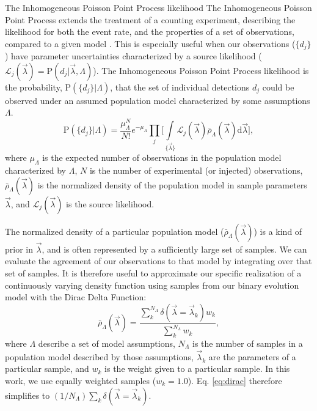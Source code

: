 \documentclass[twocolumn]{aastex631}
\newcommand*{\pprob}{\mathrm{P}}
\newcommand*{\gwL}{\mathcal{L}}
\newcommand*{\BinaryParameters}{\vec{\lambda}}
\newcommand*{\AllBinaryParameters}{\{\vec{\lambda}\}}
\newcommand*{\FormationParameters}{\Lambda}
\newcommand*{\gwdetj}{d_j}
\newcommand*{\gwdets}{\{\gwdetj\}}
\begin{document}
\begin{subsection}{The Inhomogeneous Poisson Point Process likelihood}
The Inhomogeneous Poisson Point Process extends the treatment
    of a counting experiment,
    describing the likelihood for both the event rate,
    and the properties of a set of observations,
    compared to a given model
    \citep{moller2003statistical}.
This is especially useful when our observations 
    ($\gwdets$) have parameter uncertainties characterized by
    a source likelihood
    ($\gwL_j(\BinaryParameters) = \pprob(\gwdetj|\BinaryParameters, \FormationParameters)$).
The Inhomogeneous Poisson Point Process likelihood
    is the probability, $\pprob(\gwdets|\FormationParameters)$,
    that the set of individual detections $\gwdetj$ could be observed
    under an assumed population model characterized by some assumptions $\FormationParameters$.
\begin{equation}
\label{eq:ihpp}
    \pprob(\gwdets|\FormationParameters) = \frac{\mu^{N}_{\FormationParameters}}{N!}
        e^{-\mu_{\FormationParameters}}
        \prod\limits_{j} \Big[ \int\limits_{\AllBinaryParameters}
        \gwL_j(\BinaryParameters)
        \bar{\rho}_{\FormationParameters}(\BinaryParameters)
        \mathrm{d}\BinaryParameters
        \Big],
\end{equation}
where $\mu_{\FormationParameters}$ is the expected number of observations in
    the population model characterized by $\FormationParameters$,
    $N$ is the number of experimental (or injected) observations,
    $\bar{\rho}_{\FormationParameters}(\BinaryParameters)$
    is the normalized density of the population model
    in sample parameters $\BinaryParameters$,
    and $\gwL_j(\BinaryParameters)$ is the source likelihood.

The normalized density of a particular population model
    ($\bar{\rho}_{\FormationParameters}(\BinaryParameters)$)
    is a kind of prior in $\BinaryParameters$,
    and is often represented by a sufficiently large set of samples.
We can evaluate the agreement of our observations to that model
    by integrating over that set of samples.
It is therefore useful to approximate our specific realization
    of a continuously varying density function
    using samples from our binary evolution model
    with the Dirac Delta Function:
\begin{equation}
\label{eq:dirac}
\bar{\rho}_{\FormationParameters}(\BinaryParameters) = 
    \frac{
    \sum_k^{N_{\FormationParameters}} \delta(\BinaryParameters = \BinaryParameters_k) w_k
    }{\sum_k^{N_{\FormationParameters}} w_k},
\end{equation}
where $\FormationParameters$ describe a set of model assumptions,
    $N_{\FormationParameters}$ is the number of samples
    in a population model described by those assumptions,
    $\BinaryParameters_k$ are the parameters of a particular sample,
    and $w_k$ is the weight given to a particular sample.
In this work, we use equally weighted samples ($w_k = 1.0$).
Eq. \ref{eq:dirac} therefore simplifies to 
    $(1/N_{\FormationParameters})\sum_k \delta(\BinaryParameters = \BinaryParameters_k)$.


\end{subsection}
\end{document}
